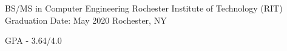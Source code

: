 \smallskip
\begin{cventries}
  \cventry
    {BS/MS in Computer Engineering}
	{Rochester Institute of Technology (RIT)}
    {Graduation Date: May 2020}
    {Rochester, NY}
    {
      \begin{cvitems}
	  \item {GPA - 3.64/4.0}
      \end{cvitems}
    }
\end{cventries}
